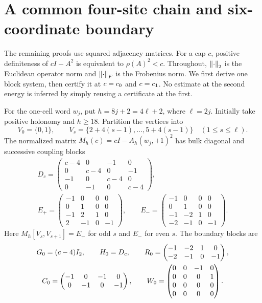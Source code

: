 \section{A common four-site chain and six-coordinate boundary}
\label{sec:chain}

The remaining proofs use squared adjacency matrices. For a cap $c$,
positive definiteness of $cI-A^2$ is equivalent to $\rho(A)^2<c$.
Throughout, $\left\lVert\cdot\right\rVert_2$ is the Euclidean operator norm and
$\left\lVert\cdot\right\rVert_F$ is the Frobenius norm.
We first derive one block system, then certify it at $c=c_0$ and
$c=c_1$. No estimate at the second energy is inferred by simply
reusing a certificate at the first.

For the one-cell word $w_j$, put $h=8j+2=4\ell+2$, where $\ell=2j$.
Initially take positive holonomy and $h\ge18$. Partition the vertices into
\[
 V_0=\{0,1\},\qquad
 V_s=\{2+4(s-1),\ldots,5+4(s-1)\}\quad(1\le s\le\ell).
\]
The normalized matrix $M_h(c)=cI-A_h(w_j,+1)^2$ has bulk diagonal and
successive coupling blocks
\begin{gather}
 D_c=\begin{pmatrix}
 c-4&0&-1&0\\0&c-4&0&-1\\-1&0&c-4&0\\0&-1&0&c-4
 \end{pmatrix},\label{eq:D}\\
 E_+=\begin{pmatrix}-1&0&0&0\\0&1&0&0\\-1&2&1&0\\2&-1&0&-1\end{pmatrix},
 \qquad
 E_-=\begin{pmatrix}-1&0&0&0\\0&1&0&0\\-1&-2&1&0\\-2&-1&0&-1\end{pmatrix}.
 \label{eq:E}
\end{gather}
Here $M_h[V_s,V_{s+1}]=E_+$ for odd $s$ and $E_-$ for even $s$.
The boundary blocks are
\begin{gather}
 G_0=(c-4)I_2,\qquad H_0=D_c,\qquad
 R_0=\begin{pmatrix}-1&-2&1&0\\-2&-1&0&-1\end{pmatrix},\notag\\
 C_0=\begin{pmatrix}-1&0&-1&0\\0&-1&0&-1\end{pmatrix},\qquad
 W_0=\begin{pmatrix}0&0&-1&0\\0&0&0&1\\0&0&0&0\\0&0&0&0\end{pmatrix}.
 \label{eq:boundary-data}
\end{gather}
